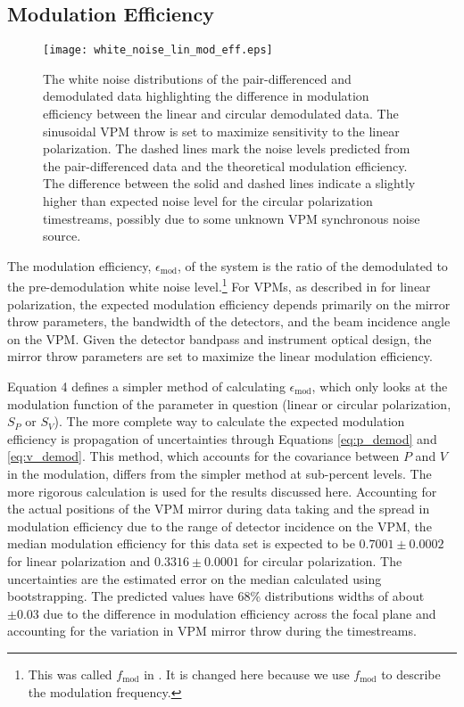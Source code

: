 \documentclass[twocolumn, tighten, numberedappendix, twocolappendix]{aastex63}
\begin{document}
\subsection{\label{sec:mod_eff} Modulation Efficiency}

\begin{figure}
    \centering
    \texttt{[image: white\_noise\_lin\_mod\_eff.eps]}
    \caption{The white noise distributions of the pair-differenced and demodulated data highlighting the difference in modulation efficiency between the linear and circular demodulated data. The sinusoidal VPM throw is set to maximize sensitivity to the linear polarization. The dashed lines mark the noise levels predicted from the pair-differenced data and the theoretical modulation efficiency. The difference between the solid and dashed lines indicate a slightly higher than expected noise level for the circular polarization timestreams, possibly due to some unknown VPM synchronous noise source.}
    \label{fig:noise_hist}
\end{figure}

The modulation efficiency, $\epsilon_\mathrm{mod}$, of the system is the ratio of the demodulated to the pre-demodulation white noise level.\footnote{This was called $f_\mathrm{mod}$ in \cite{harr18}. It is changed here because we use $f_\mathrm{mod}$ to describe the modulation frequency.} For VPMs, as described in \cite{harr18} for linear polarization, the expected modulation efficiency depends primarily on the mirror throw parameters, the bandwidth of the detectors, and the beam incidence angle on the VPM. Given the detector bandpass and instrument optical design, the mirror throw parameters are set to maximize the linear modulation efficiency. 

\cite{harr18} Equation 4 defines a simpler method of calculating $\epsilon_\mathrm{mod}$, which only looks at the modulation function of the parameter in question (linear or circular polarization, $S_P$ or $S_V$). The more complete way to calculate the expected modulation efficiency is propagation of uncertainties through Equations \ref{eq:p_demod} and \ref{eq:v_demod}. This method, which accounts for the covariance between $P$ and $V$ in the modulation, differs from the simpler method at sub-percent levels. The more rigorous calculation is used for the results discussed here. Accounting for the actual positions of the VPM mirror during data taking and the spread in modulation efficiency due to the range of detector incidence on the VPM, the median modulation efficiency for this data set is expected to be $0.7001\pm0.0002$ for linear polarization and $0.3316\pm0.0001$ for circular polarization. The uncertainties are the estimated error on the median calculated using bootstrapping. The predicted values have 68\% distributions widths of about $\pm0.03$ due to the difference in modulation efficiency across the focal plane and accounting for the variation in VPM mirror throw during the timestreams.
\end{document}
